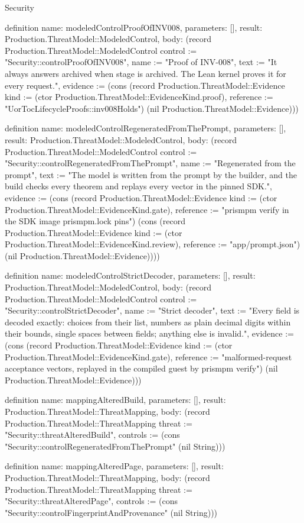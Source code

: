 \begin{lexlean}{Security}
\begin{semanticmodule}
definition{
  name: modeledControlProofOfINV008,
  parameters: [],
  result: Production.ThreatModel::ModeledControl,
  body: (record Production.ThreatModel::ModeledControl {control := "Security::controlProofOfINV008", name := "Proof of INV-008", text := "It always answers archived when stage is archived. The Lean kernel proves it for every request.", evidence := (cons (record Production.ThreatModel::Evidence {kind := (ctor Production.ThreatModel::EvidenceKind.proof), reference := "UorTocLifecycleProofs::inv008Holds"}) (nil Production.ThreatModel::Evidence))})
}

definition{
  name: modeledControlRegeneratedFromThePrompt,
  parameters: [],
  result: Production.ThreatModel::ModeledControl,
  body: (record Production.ThreatModel::ModeledControl {control := "Security::controlRegeneratedFromThePrompt", name := "Regenerated from the prompt", text := "The model is written from the prompt by the builder, and the build checks every theorem and replays every vector in the pinned SDK.", evidence := (cons (record Production.ThreatModel::Evidence {kind := (ctor Production.ThreatModel::EvidenceKind.gate), reference := "prismpm verify in the SDK image prismpm.lock pins"}) (cons (record Production.ThreatModel::Evidence {kind := (ctor Production.ThreatModel::EvidenceKind.review), reference := "app/prompt.json"}) (nil Production.ThreatModel::Evidence)))})
}

definition{
  name: modeledControlStrictDecoder,
  parameters: [],
  result: Production.ThreatModel::ModeledControl,
  body: (record Production.ThreatModel::ModeledControl {control := "Security::controlStrictDecoder", name := "Strict decoder", text := "Every field is decoded exactly: choices from their list, numbers as plain decimal digits within their bounds, single spaces between fields; anything else is invalid.", evidence := (cons (record Production.ThreatModel::Evidence {kind := (ctor Production.ThreatModel::EvidenceKind.gate), reference := "malformed-request acceptance vectors, replayed in the compiled guest by prismpm verify"}) (nil Production.ThreatModel::Evidence))})
}

definition{
  name: mappingAlteredBuild,
  parameters: [],
  result: Production.ThreatModel::ThreatMapping,
  body: (record Production.ThreatModel::ThreatMapping {threat := "Security::threatAlteredBuild", controls := (cons "Security::controlRegeneratedFromThePrompt" (nil String))})
}

definition{
  name: mappingAlteredPage,
  parameters: [],
  result: Production.ThreatModel::ThreatMapping,
  body: (record Production.ThreatModel::ThreatMapping {threat := "Security::threatAlteredPage", controls := (cons "Security::controlFingerprintAndProvenance" (nil String))})
}


\end{semanticmodule}
\end{lexlean}
